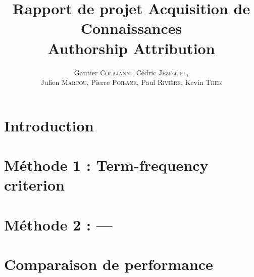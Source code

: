 \documentclass[a4paper]{article}
\author{Gautier \textsc{Colajanni}, Cédric \textsc{Jezequel},\\ Julien \textsc{Marcou}, Pierre \textsc{Poilane}, Paul \textsc{Rivière}, Kevin \textsc{Thek}}
\title{Rapport de projet Acquisition de Connaissances \\ Authorship Attribution}
\begin{document}
\maketitle

\section{Introduction}

\section{Méthode 1 : Term-frequency criterion}

\section{Méthode 2 : ---}

\section{Comparaison de performance}
\end{document}
